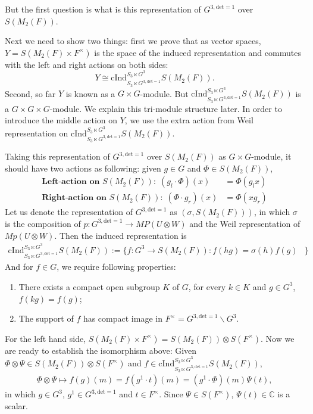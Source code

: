 \documentclass[12pt,a4paper,english]{article}
\theoremstyle{plain}
\theoremstyle{definition}
\newcommand{\cInd}{\mathrm{cInd}}
\begin{document}
But the first question is what is this representation of $G^{3,\text{det}=1}$ over $S(M_{2}(F))$.


Next we need to show two things: first we prove that as vector spaces, $Y=S(M_{2}(F)\times F^{\times })$ is the space of the induced representation and commutes with the left and right actions on both sides:
\begin{equation*}
    Y\cong \cInd^{S_{3}\ltimes G^{3}}_{S_{3}\ltimes G^{3,\text{det}=1}}S(M_{2}(F)).
\end{equation*}
Second, so far $Y$ is known as a $G\times G$-module. But $\cInd^{S_{3}\ltimes G^{3}}_{S_{3}\ltimes G^{3,\text{det}=1}}S(M_{2}(F))$ is a $G\times G\times G$-module. We explain  this tri-module structure later.   In order to introduce the middle action on $Y$, we use the extra action from Weil representation on $\cInd^{S_{3}\ltimes G^{3}}_{S_{3}\ltimes G^{3,\text{det}=1}}S(M_{2}(F))$.


Taking this representation of $G^{3,\text{det}=1}$ over $S(M_{2}(F))$ as $G\times G$-module, it should have two actions as following: given $g\in G$ and $\Phi\in S(M_{2}(F))$,
\begin{align*}
     \textbf{Left-action on $S(M_{2}(F))$:}\ \ (g_{l}\cdot \Phi)(x)&=\Phi(g_{l}x)\\
     \textbf{Right-action on $S(M_{2}(F))$:}\ \ ( \Phi\cdot g_{r})(x)&=\Phi(xg_{r})
\end{align*}
Let us denote the representation of $G^{3, \text{det}=1}$ as $(\sigma, S(M_{2}(F)))$, in which $\sigma$ is the composition of $p: G^{3,\text{det}=1}\rightarrow MP(U\otimes W)$ and the Weil representation of $Mp(U\otimes W)$. Then the induced representation is 
\begin{align*}
       \cInd^{S_{3}\ltimes G^{3}}_{S_{3}\ltimes G^{3,\text{det}=1}}S(M_{2}(F)):=\big\{f:G^{3}\rightarrow S(M_{2}(F)): f(hg)=\sigma(h)f(g)&\big\}
\end{align*}
And for $f\in G$, we require following properties:    
\begin{enumerate}
    \item There exists a compact open subgroup $K$ of $G$, for every $k\in K$ and $g\in G^{3}$, $f(kg)=f(g)$;
    \item The support of $f$ has compact image in $F^{\times}=G^{3, \text{det}=1}\backslash G^{3}$.
\end{enumerate}
For the left hand side, $S(M_{2}(F)\times F^{\times})= S(M_{2}(F))\otimes S(F^{\times})$. Now we are ready to establish the isomorphism above: Given $\Phi\otimes \Psi\in S(M_{2}(F))\otimes S(F^{\times})$ and $f\in   \cInd^{S_{3}\ltimes G^{3}}_{S_{3}\ltimes G^{3,\text{det}=1}}S(M_{2}(F))$,
\begin{align*}
    \Phi\otimes \Psi \mapsto f(g)(m)=f(g^{1}\cdot t)(m)=(g^{1}\cdot\Phi)(m)\Psi(t),
\end{align*}
in which $g\in G^{3}$, $g^{1}\in G^{3,\text{det}=1}$ and $t\in F^{\times }$. Since $\Psi\in S(F^{\times})$, $\Psi(t)\in \mathbb{C}$ is a scalar.
\end{document}
